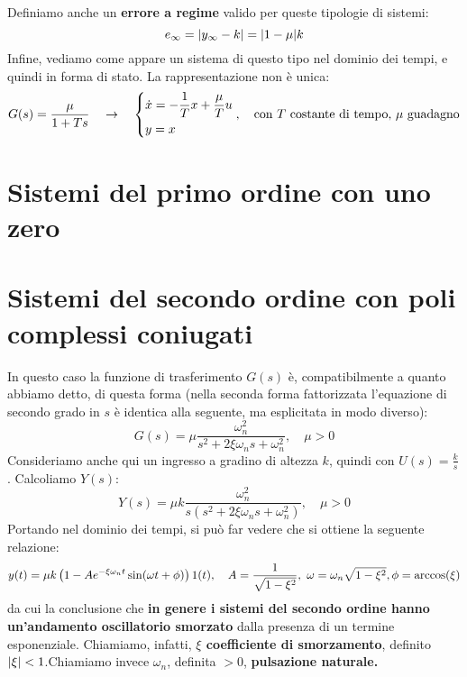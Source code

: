 \bb
Definiamo anche un \textbf{errore a regime} valido per queste tipologie di sistemi:
\begin{equation}
e_{\infty} = \abs{y_\infty - k} = \abs{1-\mu}k
\end{equation}
Infine, vediamo come appare un sistema di questo tipo nel dominio dei tempi, e quindi in forma di stato. La rappresentazione non è unica:
\begin{align*}
G(s) = \frac{\mu}{1+Ts} \quad \rightarrow \quad \begin{dcases}
\dot x = -\frac{1}{T}x + \frac{\mu}{T} u \\ y=x
\end{dcases}, \quad \textrm{con} \ T \textrm{ costante di tempo, } \mu \textrm{ guadagno} 
\end{align*}

\section{Sistemi del primo ordine con uno zero}

\section{Sistemi del secondo ordine con poli complessi coniugati}
In questo caso la funzione di trasferimento $G(s)$ è, compatibilmente a quanto abbiamo detto, di questa forma (nella seconda forma fattorizzata l'equazione di secondo grado in $s$ è identica alla seguente, ma esplicitata in modo diverso):
\begin{equation}
G(s) = \mu \frac{\omega_n^2}{s^2+2\xi\omega_n s + \omega_n^2}, \quad \mu > 0 
\end{equation}
Consideriamo anche qui un ingresso a gradino di altezza $k$, quindi con $U(s) = \frac{k}{s}$. Calcoliamo $Y(s)$:
\begin{equation*}
Y(s) = \mu k \frac{\omega_n^2}{s(s^2+2\xi\omega_n s + \omega_n^2)}, \quad \mu > 0 
\end{equation*}
Portando nel dominio dei tempi, si può far vedere che si ottiene la seguente relazione:
\begin{equation}
y(t) = \mu k \left( 1-Ae^{-\xi \omega_n t}\sin(\omega t + \phi) \right)1(t), \quad A = \frac{1}{\sqrt{1-\xi^2}}, \ \omega = \omega_n\sqrt{1-\xi^2}, \phi = \arccos(\xi) 
\end{equation}
 da cui la conclusione che \textbf{in genere i sistemi del secondo ordine hanno un'andamento oscillatorio smorzato} dalla presenza di un termine esponenziale. Chiamiamo, infatti, \textbf{$\xi$ coefficiente di smorzamento}, definito $\abs{\xi} < 1$.Chiamiamo invece $\omega_n$, definita $> 0$, \textbf{pulsazione naturale.}

